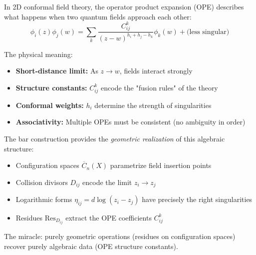\begin{remark}\label{rem:physical-genesis}
In 2D conformal field theory, the operator product expansion (OPE) describes what happens when two quantum fields approach each other:
$$\phi_i(z)\phi_j(w) = \sum_{k} \frac{C_{ij}^k}{(z-w)^{h_i+h_j-h_k}} \phi_k(w) + \text{(less singular)}$$

The physical meaning:
\begin{itemize}
\item \textbf{Short-distance limit:} As $z \to w$, fields interact strongly
\item \textbf{Structure constants:} $C_{ij}^k$ encode the "fusion rules" of the theory
\item \textbf{Conformal weights:} $h_i$ determine the strength of singularities
\item \textbf{Associativity:} Multiple OPEs must be consistent (no ambiguity in order)
\end{itemize}

The bar construction provides the \emph{geometric realization} of this algebraic structure:
\begin{itemize}
\item Configuration spaces $\overline{C}_n(X)$ parametrize field insertion points
\item Collision divisors $D_{ij}$ encode the limit $z_i \to z_j$
\item Logarithmic forms $\eta_{ij} = d\log(z_i - z_j)$ have precisely the right singularities
\item Residues $\text{Res}_{D_{ij}}$ extract the OPE coefficients $C_{ij}^k$
\end{itemize}

The miracle: purely geometric operations (residues on configuration spaces) recover purely algebraic data (OPE structure constants).
\end{remark}

